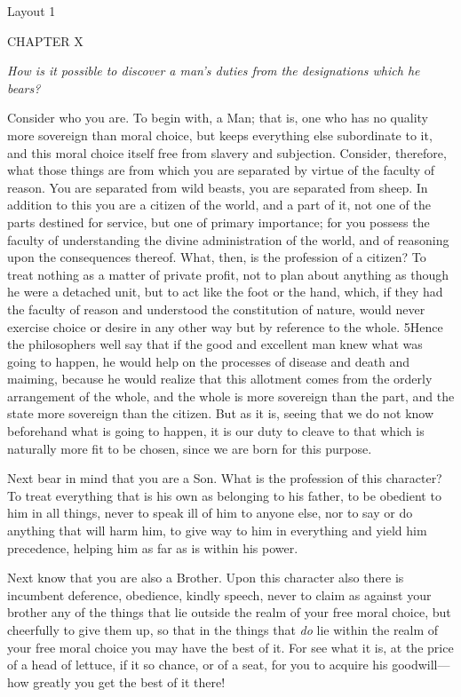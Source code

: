 

Layout 1

CHAPTER X

\emph{How is it possible to discover a man's duties from the designations which he bears?}

Consider who you are. To begin with, a Man; that is, one who has no quality more sovereign than moral choice, but keeps everything else subordinate to it, and this moral choice itself free from slavery and subjection. Consider, therefore, what those things are from which you are separated by virtue of the faculty of reason. You are separated from wild beasts, you are separated from sheep. In addition to this you are a citizen of the world, and a part of it, not one of the parts destined for service, but one of primary importance; for you possess the faculty of understanding the divine administration of the world, and of reasoning upon the consequences thereof. What, then, is the profession of a citizen? To treat nothing as a matter of private profit, not to plan about anything as though he were a detached unit, but to act like the foot or the hand, which, if they had the faculty of reason and understood the constitution of nature, would never exercise choice or desire in any other way but by reference to the whole. 5Hence the philosophers well say that if the good and excellent man knew what was going to happen, he would help on the processes of disease and death and maiming, because he would realize that this allotment comes from the orderly arrangement of the whole, and the whole is more sovereign than the part, and the state more sovereign than the citizen. But as it is, seeing that we do not know beforehand what is going to happen, it is our duty to cleave to that which is naturally more fit to be chosen, since we are born for this purpose.

Next bear in mind that you are a Son. What is the profession of this character? To treat everything that is his own as belonging to his father, to be obedient to him in all things, never to speak ill of him to anyone else, nor to say or do anything that will harm him, to give way to him in everything and yield him precedence, helping him as far as is within his power.

Next know that you are also a Brother. Upon this character also there is incumbent deference, obedience, kindly speech, never to claim as against your brother any of the things that lie outside the realm of your free moral choice, but cheerfully to give them up, so that in the things that \emph{do} lie within the realm of your free moral choice you may have the best of it. For see what it is, at the price of a head of lettuce, if it so chance, or of a seat, for you to acquire his goodwill—how greatly you get the best of it there!

